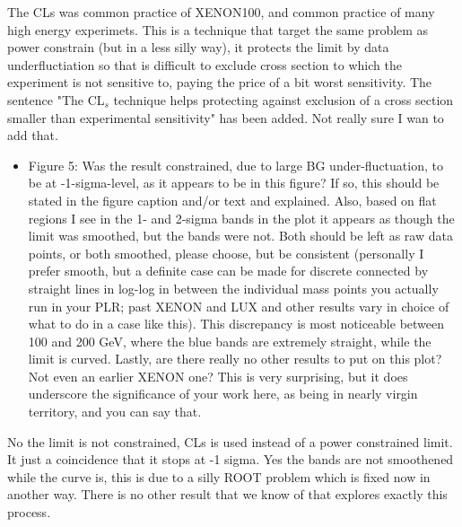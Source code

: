 \documentclass{article}
\begin{document}
The CLs was common practice of XENON100, and common practice of many high energy experimets. 
This is a technique that target the same problem as power constrain (but in a less silly way),
it protects the limit by data underfluctiation so that is difficult to exclude
cross section to which the experiment is not sensitive to, paying the price of a bit worst sensitivity.
The sentence {\color{red}"The CL$_s$ technique helps protecting against exclusion of a cross section
smaller than experimental sensitivity" has been added}. Not really sure I wan to add that. 



\begin{itemize}
	\item {\color{blue} 
Figure 5: Was the result constrained, due to large BG
under-fluctuation, to be at -1-sigma-level, as it appears to be in
this figure? If so, this should be stated in the figure caption and/or
text and explained. Also, based on flat regions I see in the 1- and
2-sigma bands in the plot it appears as though the limit was smoothed,
but the bands were not. Both should be left as raw data points, or
both smoothed, please choose, but be consistent (personally I prefer
smooth, but a definite case can be made for discrete connected by
straight lines in log-log in between the individual mass points you
actually run in your PLR; past XENON and LUX and other results vary in
choice of what to do in a case like this). This discrepancy is most
noticeable between 100 and 200 GeV, where the blue bands are extremely
straight, while the limit is curved. Lastly, are there really no other
results to put on this plot? Not even an earlier XENON one? This is
very surprising, but it does underscore the significance of your work
here, as being in nearly virgin territory, and you can say that.}
\end{itemize}

No the limit is not constrained, CLs is used instead of a power constrained limit.
It just a coincidence that it stops at -1 sigma.
Yes the bands are not smoothened while the curve is, this is due to a silly ROOT 
problem which is {\color{red} fixed now} in another way.
There is no other result that we know of that explores exactly this process.
\end{document}
